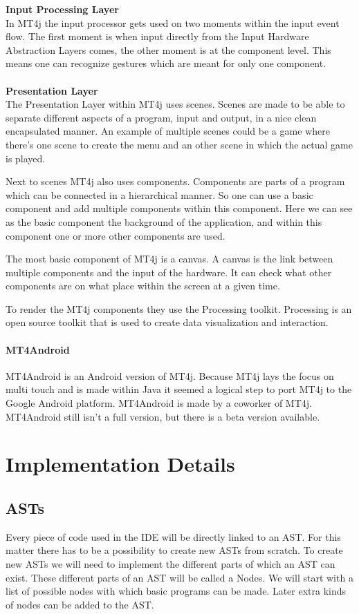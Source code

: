 \documentclass[a4paper,12pt]{report}
\begin{document}
\textbf{Input Processing Layer}
\\
In MT4j the input processor gets used on two moments within the input event flow. The first moment is when input directly from the Input Hardware Abstraction Layers comes, the other moment
is at the component level. This means one can recognize gestures which are meant for only one component.
\\
\\
\textbf{Presentation Layer}
\\
The Presentation Layer within MT4j uses scenes. Scenes are made to be able to separate different aspects of a program, input and output, in a nice clean encapsulated 
manner. An example of multiple scenes could be a game where there's one scene to create the menu and an other scene in which the actual game is played.

Next to scenes MT4j also uses components. Components are parts of a program which can be connected in a hierarchical manner. So one can use a basic component and add multiple
components within this component. Here we can see as the basic component the background of the application, and within this component one or more other components are used.

The most basic component of MT4j is a canvas. A canvas is the link between multiple components and the input of the hardware. It can check what other components are on
what place within the screen at a given time.

To render the MT4j components they use the Processing toolkit. Processing is an open source toolkit that is used to create data visualization and interaction.

\subsubsection{MT4Android}
MT4Android is an Android version of MT4j. Because MT4j lays the focus on multi touch and is made within Java it seemed a logical step to port MT4j to the Google Android 
platform. MT4Android is made by a coworker of MT4j. MT4Android still isn't a full version, but there is a beta version available.


\chapter{Implementation Details}
\section{ASTs}
 Every piece of code used in the IDE will be directly linked to an AST. For this matter there has to be a possibility to create new ASTs from scratch.
To create new ASTs we will need to implement the different parts of which an AST can exist. These different parts of an AST will be called a Nodes. We will start with
a list of possible nodes with which basic programs can be made. Later extra kinds of nodes can be added to the AST.
\end{document}
